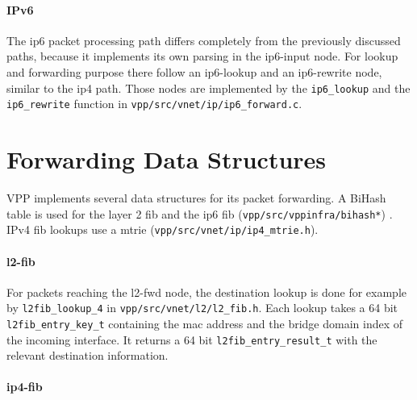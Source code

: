 \paragraph{IPv6}

The ip6 packet processing path differs completely from the previously
discussed paths, because it implements its own parsing in the
ip6-input node. For lookup and forwarding purpose there follow an
ip6-lookup and an ip6-rewrite node, similar to the \Ac{ip4} path.
Those nodes are implemented by the \lstinline|ip6_lookup| and the
\lstinline|ip6_rewrite| function in
\lstinline|vpp/src/vnet/ip/ip6_forward.c|.

 
\section{Forwarding Data Structures}

VPP implements several data structures for its packet forwarding. A
BiHash table is used for the layer 2 \Ac{fib} and the ip6 \Ac{fib}
(\lstinline|vpp/src/vppinfra/bihash*|) \cite{vppwiki:bihash}. IPv4
\Ac{fib} lookups use a mtrie
(\lstinline|vpp/src/vnet/ip/ip4_mtrie.h|).



\paragraph{l2-fib}

For packets reaching the l2-fwd node, the destination lookup is done
for example by \lstinline|l2fib_lookup_4| in
\lstinline|vpp/src/vnet/l2/l2_fib.h|. 
Each lookup takes a 64 bit \lstinline|l2fib_entry_key_t| containing
the mac address and the bridge domain index of the incoming interface.
It returns a 64 bit \lstinline|l2fib_entry_result_t| with the relevant
destination information. 


\paragraph{\Ac{ip4}-fib}



